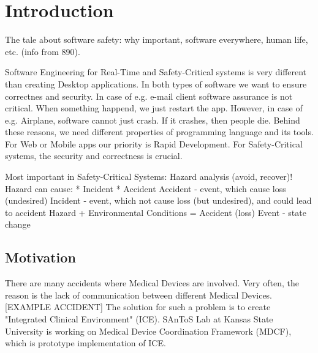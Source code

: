 
\cleardoublepage


\chapter{Introduction}
\label{introduction}

The tale about software safety: why important, software everywhere, human life, etc. (info from 890).

Software Engineering for Real-Time and Safety-Critical systems is very different than creating Desktop applications. In both types of software we want to ensure correctnes and security. In case of e.g. e-mail client software assurance is not critical. When something happend, we just restart the app. However, in case of e.g. Airplane, software cannot just crash. If it crashes, then people die. Behind these reasons, we need different properties of programming language and its tools. For Web or Mobile apps our priority is Rapid Development. For Safety-Critical systems, the security and correctness is crucial.


Most important in Safety-Critical Systems: Hazard analysis (avoid, recover)!
Hazard can cause:
	* Incident
	* Accident
Accident - event, which cause loss (undesired)
Incident - event, which not cause loss (but undesired), and could lead to accident
Hazard + Environmental Conditions = Accident (loss)
Event - state change


\section{Motivation}
\label{introduction:motivation}
There are many accidents where Medical Devices are involved. Very often, the reason is the lack of communication between different Medical Devices. [EXAMPLE ACCIDENT]
The solution for such a problem is to create "Integrated Clinical Environment" (ICE). SAnToS Lab at Kansas State University is working on Medical Device Coordination Framework (MDCF), which is prototype implementation of ICE.  

